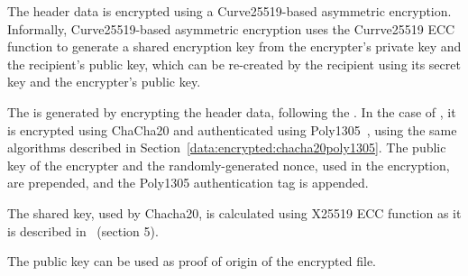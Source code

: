 The header data is encrypted using a Curve25519-based asymmetric encryption.
%
Informally, Curve25519-based asymmetric encryption uses the Currve25519 ECC function to generate a shared encryption key from the encrypter's private key and the recipient's public key, which can be re-created by the recipient using its secret key and the encrypter's public key.
%

The  is generated by encrypting the header data, following the .
%
In the case of , it is encrypted using ChaCha20 and authenticated using Poly1305~\cite{RFC8439}, using the same algorithms described in Section~\ref{data:encrypted:chacha20poly1305}.
%
The public key of the encrypter and the randomly-generated nonce, used in the encryption, are prepended, and the Poly1305 authentication tag is appended.


The shared key, used by Chacha20, is calculated using X25519 ECC function as it is described in~\cite{RFC7748} (section 5).
%

The public key can be used as proof of origin of the encrypted file.
%

